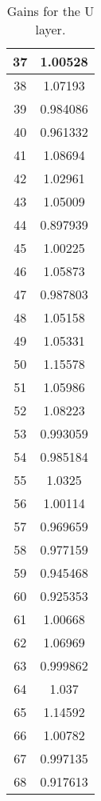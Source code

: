 \begin{table}[h]
\begin{subtable}[h]{2in}
{\begin{tabular}{|c|c|}
37	&	1.00528	\\	\hline
38	&	1.07193	\\	\hline
39	&	0.984086	\\	\hline
40	&	0.961332	\\	\hline
41	&	1.08694	\\	\hline
42	&	1.02961	\\	\hline
43	&	1.05009	\\	\hline
44	&	0.897939	\\	\hline
45	&	1.00225	\\	\hline
46	&	1.05873	\\	\hline
47	&	0.987803	\\	\hline
48	&	1.05158	\\	\hline
49	&	1.05331	\\	\hline
50	&	1.15578	\\	\hline
51	&	1.05986	\\	\hline
52	&	1.08223	\\	\hline
53	&	0.993059	\\	\hline
54	&	0.985184	\\	\hline
55	&	1.0325	\\	\hline
56	&	1.00114	\\	\hline
57	&	0.969659	\\	\hline
58	&	0.977159	\\	\hline
59	&	0.945468	\\	\hline
60	&	0.925353	\\	\hline
61	&	1.00668	\\	\hline
62	&	1.06969	\\	\hline
63	&	0.999862	\\	\hline
64	&	1.037	\\	\hline
65	&	1.14592	\\	\hline
66	&	1.00782	\\	\hline
67	&	0.997135	\\	\hline
68	&	0.917613	\\	\hline
        \end{tabular}
        }
        \caption{Gains for the U layer.}
    \end{subtable}
    \quad
    \begin{subtable}[h]{2in}
        \centering{}
\end{subtable}
\end{table}
